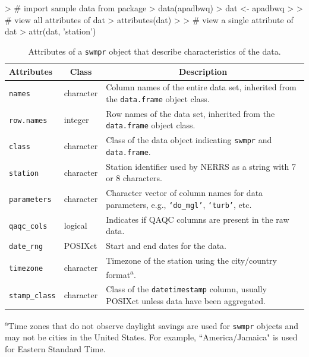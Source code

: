 \begin{example}
> # import sample data from package
> data(apadbwq)
> dat <- apadbwq
> 
> # view all attributes of dat
> attributes(dat)
>  
> # view a single attribute of dat
> attr(dat, 'station')
\end{example}
 
\begin{table}[!tbp]
\caption{Attributes of a \texttt{swmpr} object that describe characteristics of the data.\label{tab:attributes}} 
\begin{center}
\begin{tabular}{lp{0.75in}p{3.25in}}
\hline\hline
\multicolumn{1}{l}{Attributes}&\multicolumn{1}{c}{Class}&\multicolumn{1}{c}{Description}\tabularnewline
\hline
\texttt{names}&character&Column names of the entire data set, inherited from the \texttt{data.frame} object class.\tabularnewline
\texttt{row.names}&integer&Row names of the data set, inherited from the \texttt{data.frame} object class.\tabularnewline
\texttt{class}&character&Class of the data object indicating \texttt{swmpr} and \texttt{data.frame}.\tabularnewline
\texttt{station}&character&Station identifier used by NERRS as a string with 7 or 8 characters.\tabularnewline
\texttt{parameters}&character&Character vector of column names for data parameters, e.g., \texttt{`do\_mgl'}, \texttt{`turb'}, etc.\tabularnewline
\texttt{qaqc\_cols}&logical&Indicates if QAQC columns are present in the raw data.\tabularnewline
\texttt{date\_rng}&POSIXct&Start and end dates for the data.\tabularnewline
\texttt{timezone}&character&Timezone of the station using the city/country format\textsuperscript{a}.\tabularnewline
\texttt{stamp\_class}&character&Class of the \texttt{datetimestamp} column, usually POSIXct unless data have been aggregated.\tabularnewline
\hline
\end{tabular}\end{center}

\textsuperscript{a}\footnotesize Time zones that do not observe daylight savings are used for \texttt{swmpr} objects and may not be cities in the United States.  For example, ``America/Jamaica" is used for Eastern Standard Time.\end{table}


